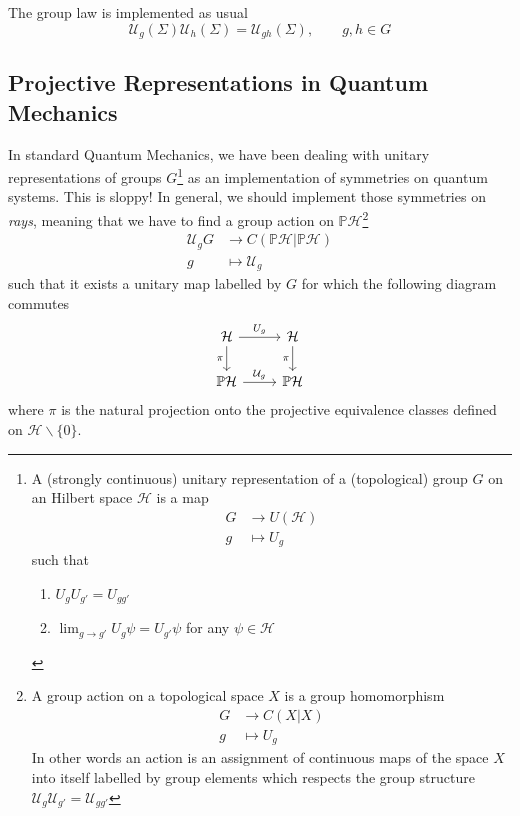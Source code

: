 \documentclass[11pt]{article}
\theoremstyle{definition}
\numberwithin{equation}{section}
\newcommand*\cH{\mathcal{H}}
\newcommand*\cU{\mathcal{U}}
\newcommand*\bbP{\mathbb{P}}
\begin{document}
The group law is implemented as usual
\begin{equation}
	\cU_{g}(\Sigma)\cU_{h}(\Sigma)=\cU_{gh}(\Sigma),\qquad g,h\in G
\end{equation}

\subsection{Projective Representations in Quantum Mechanics}

In standard Quantum Mechanics, we have been dealing with unitary representations of groups $G$\footnote{A (strongly continuous) unitary representation of a (topological) group $G$ on an Hilbert space $\cH$ is a map
\begin{equation}
\begin{aligned}
    G &\to U(\cH)\\
g &\mapsto U_g
    \end{aligned}
\end{equation} 
such that
\begin{enumerate}
    \item $U_g U_{g'} = U_{g g'}$
    \item $\lim_{g \to g'} U_g \psi = U_{g'}  \psi$ for any $\psi \in \cH$
\end{enumerate}
} 
as an implementation of symmetries on quantum systems. This is sloppy! In general, we should implement those symmetries on \textit{rays}, meaning that we have to find a group action on $\bbP \cH$\footnote{A group action on a topological space $X$ is a group homomorphism
\begin{equation}
\begin{split}
    G &\to C(X|X)\\
    g &\mapsto U_g
\end{split}
\end{equation} 
In other words an action is an assignment of continuous maps of the space $X$ into itself labelled by group elements which respects the group structure $\cU_g \cU_{g'}= \cU_{gg'}$}
\begin{equation}
    \begin{aligned}
    \cU_{g}G &\to C (\bbP \cH|\bbP \cH)\\
    g &\mapsto \cU_g
    \end{aligned}
\end{equation}
such that it exists a unitary map labelled by $G$ for which the following diagram commutes
\[
\begin{tikzcd}
\cH \arrow{r}{U_g} \arrow[swap]{d}{\pi} & \cH   \arrow[swap]{d}{\pi}  \\
\bbP \cH \arrow{r}{\cU_g} & \bbP \cH  
\end{tikzcd}\]
where $\pi$ is the natural projection onto the projective equivalence classes defined on $\cH \smallsetminus \{0\}$.
\end{document}
